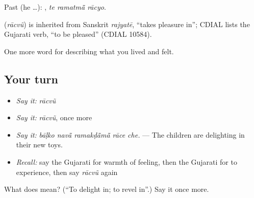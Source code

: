 Past (he …):   , \emph{te ramatmā̃ rācyo}.

\begin{cousinweb}
\textbf{} (\emph{rācvũ}) is inherited from Sanskrit \emph{rajyatē}, \textquotedblleft{}takes pleasure in\textquotedblright{}; CDIAL lists the Gujarati verb, \textquotedblleft{}to be pleased\textquotedblright{} (CDIAL 10584).
\end{cousinweb}

\begin{grammarlens}[title={What you've built}]
One more word for describing what you lived and felt.
\end{grammarlens}

\subsection*{Your turn}
\begin{itemize}
\raggedright
  \item \emph{Say it:} \emph{rācvũ}
  \item \emph{Say it:} \emph{rācvũ}, once more
  \item \emph{Say it:} \emph{bāḷko navā̃ ramakḍā̃mā̃ rāce che.} — The children are delighting in their new toys.
  \item \emph{Recall:} say the Gujarati for warmth of feeling, then the Gujarati for to experience, then say \emph{rācvũ} again
\end{itemize}

\begin{tcolorbox}[breakable,colback=teal!4,colframe=teal!35!black,title={Before you move on}]
What does  mean? (\textquotedblleft{}To delight in; to revel in\textquotedblright{}.) Say it once more.
\end{tcolorbox}
